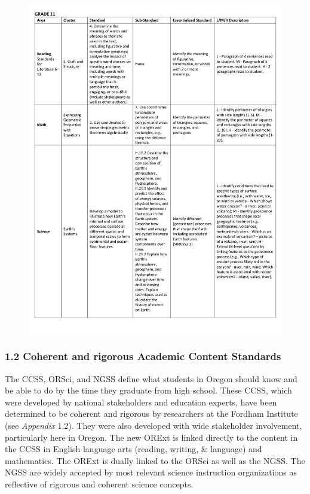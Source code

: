 \documentclass[]{article}
\begin{document}
\begin{figure}
\centering
\includegraphics{Figures/Standards/Grade11.pdf}
\caption{}
\end{figure}

\clearpage

\subsubsection{1.2 Coherent and rigorous Academic Content
Standards}\label{coherent-and-rigorous-academic-content-standards}

The CCSS, ORSci, and NGSS define what students in Oregon should know and
be able to do by the time they graduate from high school. These CCSS,
which were developed by national stakeholders and education experts,
have been determined to be coherent and rigorous by researchers at the
Fordham Institute (see \emph{Appendix} 1.2). They were also developed
with wide stakeholder involvement, particularly here in Oregon. The new
ORExt is linked directly to the content in the CCSS in English language
arts (reading, writing, \& language) and mathematics. The ORExt is
dually linked to the ORSci as well as the NGSS. The NGSS are widely
accepted by most relevant science instruction organizations as
reflective of rigorous and coherent science concepts.
\end{document}
